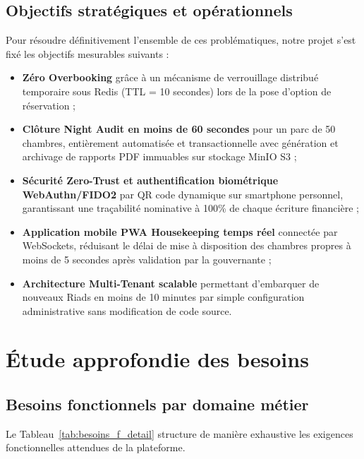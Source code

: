 \subsection{Objectifs stratégiques et opérationnels}

Pour résoudre définitivement l'ensemble de ces problématiques, notre projet s'est fixé les objectifs mesurables suivants :

\begin{itemize}
    \item \textbf{Zéro Overbooking} grâce à un mécanisme de verrouillage distribué temporaire sous Redis (TTL = 10 secondes) lors de la pose d'option de réservation ;
    \item \textbf{Clôture Night Audit en moins de 60 secondes} pour un parc de 50 chambres, entièrement automatisée et transactionnelle avec génération et archivage de rapports PDF immuables sur stockage MinIO S3 ;
    \item \textbf{Sécurité Zero-Trust et authentification biométrique WebAuthn/FIDO2} par QR code dynamique sur smartphone personnel, garantissant une traçabilité nominative à 100\% de chaque écriture financière ;
    \item \textbf{Application mobile PWA Housekeeping temps réel} connectée par WebSockets, réduisant le délai de mise à disposition des chambres propres à moins de 5 secondes après validation par la gouvernante ;
    \item \textbf{Architecture Multi-Tenant scalable} permettant d'embarquer de nouveaux Riads en moins de 10 minutes par simple configuration administrative sans modification de code source.
\end{itemize}

\section{Étude approfondie des besoins}

\subsection{Besoins fonctionnels par domaine métier}

Le Tableau~\ref{tab:besoins_f_detail} structure de manière exhaustive les exigences fonctionnelles attendues de la plateforme.

